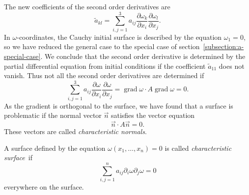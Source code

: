 The new coefficients of the second order derivatives are
\[
\tilde a_{kl}=
\sum_{i,j=1}^3a_{ij}
\frac{\partial\omega_k}{\partial x_i}
\frac{\partial\omega_l}{\partial x_j}.
\]
In $\omega$-coordinates, the Cauchy initial surface is described by
the equation $\omega_1=0$, so we have reduced the general case
to the special case of section~\ref{subsection:a-special-case}.
We conclude that the second order derivative is determined by the
partial differential equation from initial conditions if the 
coefficient $\tilde a_{11}$ does not vanish.
Thus not all the second order derivatives are determined if
\[
\sum_{i,j=1}^3
a_{ij}
\frac{\partial\omega}{\partial x_i}
\frac{\partial\omega}{\partial x_j}
=
\operatorname{grad}\omega
\cdot
A
\operatorname{grad}\omega
=0.
\]
As the gradient is orthogonal to the surface, we have found that a
surface is problematic if the normal vector $\vec{n}$ satisfies
the vector equation
\[
\vec n\cdot A\vec n=0.
\]
These vectors are called {\em characteristic normals}.

\begin{definition}
A surface defined by the equation
$\omega(x_1,\dots,x_n)=0$
is called {\em characteristic surface} if 
\[
\sum_{i,j=1}^na_{ij}\partial_i\omega\partial_j\omega=0
\]
everywhere on the surface.
\end{definition}

